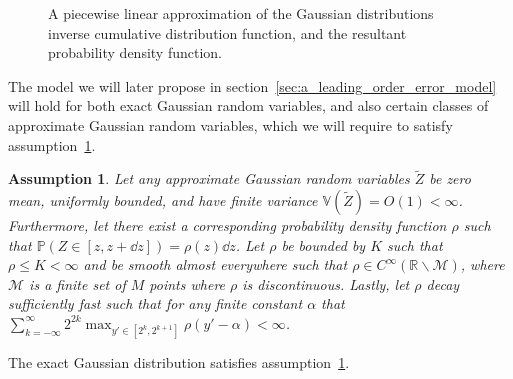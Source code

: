 \documentclass[manuscript,review]{acmart}
\newtheorem{assumption}{Assumption}[section]
\begin{document}
\begin{figure}[htb]
\centering
\hfil
{}\hfil
{}\hfil

\caption{A piecewise linear approximation of the Gaussian distributions inverse cumulative distribution function, and the resultant probability density function.}
\label{fig:piecewise_linear_approximation}
\end{figure}

The model we will later propose in section~\ref{sec:a_leading_order_error_model} will hold for both exact Gaussian random variables, and also certain classes of approximate Gaussian random variables, which we will require to satisfy assumption~\ref{asmp:approximate_random_variables}.


\begin{assumption}
\label{asmp:approximate_random_variables}
Let any approximate Gaussian random variables $ \widetilde{Z} $ be zero mean, uniformly bounded, and have finite variance $ \mathbb{V}(\widetilde{Z}) = O(1) < \infty  $. Furthermore, let there exist a corresponding probability density function $ \rho $ such that $ \mathbb{P}(Z \in [z, z + \dd{z}]) = \rho(z) \dd{z}$.  Let $ \rho $ be bounded by $ K $ such that $ \rho \leq K < \infty $ and be smooth almost everywhere such that $ \rho \in C^\infty(\mathbb{R}\backslash\mathcal{M})$, where $ \mathcal{M} $ is a finite set of $ M $ points where $ \rho $ is discontinuous. Lastly, let $ \rho $ decay sufficiently fast such that for any finite constant $ \alpha $ that $ \sum_{k=-\infty}^\infty 2^{2k} \max_{y'\in[2^{k}, 2^{k+1}]} \rho(y'-\alpha) < \infty $.
\end{assumption}

\begin{lemma}
\label{lemma:exact_gaussian_distribution}
The exact Gaussian distribution satisfies assumption~\ref{asmp:approximate_random_variables}.
\end{lemma}
\end{document}
